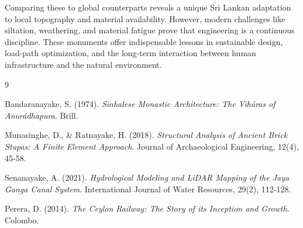 \documentclass[12pt,a4paper]{report}
\begin{document}
	Comparing these to global counterparts reveals a unique Sri Lankan adaptation to local topography and material availability. However, modern challenges like siltation, weathering, and material fatigue prove that engineering is a continuous discipline. These monuments offer indispensable lessons in sustainable design, load-path optimization, and the long-term interaction between human infrastructure and the natural environment.
	
	\renewcommand{\bibname}{References}
	\begin{thebibliography}{9}
		
		Bandaranayake, S. (1974). \textit{Sinhalese Monastic Architecture: The Viháras of Anurádhapura}. Brill.
		
		Munasinghe, D., \& Ratnayake, H. (2018). \textit{Structural Analysis of Ancient Brick Stupas: A Finite Element Approach}. Journal of Archaeological Engineering, 12(4), 45-58.
		
		Senanayake, A. (2021). \textit{Hydrological Modeling and LiDAR Mapping of the Jaya Ganga Canal System}. International Journal of Water Resources, 29(2), 112-128.
		
		Perera, D. (2014). \textit{The Ceylon Railway: The Story of its Inception and Growth}. Colombo.
		
	\end{thebibliography}
	
\end{document}
